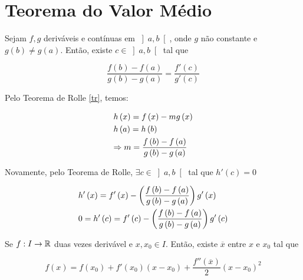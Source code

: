 \documentclass{book}
\begin{document}
\section{Teorema do Valor M\'edio} \label{sec18}

\begin{lem} \label{lem02}
Sejam $f,g$ deriv\'aveis e cont\'inuas em $\left] {a,b} \right[$, onde $g$ n\~ao constante e $g\left( b \right) \ne g\left( a \right)$. Ent\~ao, existe $c \in \left] {a,b} \right[$ tal que

\[
\frac{{f\left( b \right) - f\left( a \right)}}
{{g\left( b \right) - g\left( a \right)}} = \frac{{f'\left( c \right)}}
{{g'\left( c \right)}}
\]

\end{lem}

\begin{dem}
Pelo Teorema de Rolle \ref{tr}, temos:

\[
\begin{gathered}
h\left( x \right) = f\left( x \right) - mg\left( x \right) \hfill \\
h\left( a \right) = h\left( b \right) \hfill \\
\Rightarrow m = \frac{{f\left( b \right) - f\left( a \right)}}
{{g\left( b \right) - g\left( a \right)}} \hfill \\
\end{gathered}
\]

Novamente, pelo Teorema de Rolle, $\exists c \in \left] {a,b} \right[$ tal que $h'\left( c \right) = 0$

\[
\begin{gathered}
  h'\left( x \right) = f'\left( x \right) - \left( {\frac{{f\left( b \right) - f\left( a \right)}}
{{g\left( b \right) - g\left( a \right)}}} \right)g'\left( x \right) \hfill \\
  0 = h'\left( c \right) = f'\left( c \right) - \left( {\frac{{f\left( b \right) - f\left( a \right)}}
{{g\left( b \right) - g\left( a \right)}}} \right)g'\left( c \right) \hfill \\
\end{gathered}
\]

\end{dem}

\begin{prop}
Se $f:I \to \mathbb{R}$ duas vezes deriv\'avel e $x,x_0 \in I$. Ent\~ao, existe $\overline x$ entre $x$ e $x_0$ tal que

\[
f\left( x \right) = f\left( {x_0 } \right) + f'\left( {x_0 } \right)\left( {x - x_0 } \right) + \frac{{f''\left( {\overline x } \right)}}
{2}\left( {x - x_0 } \right)^2
\]

\end{prop}
\end{document}
